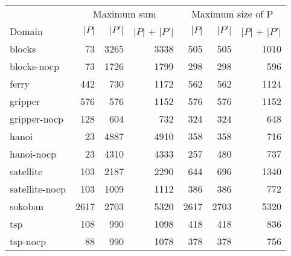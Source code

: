 \begin{tabular}{l|rrr|rrr}
	\toprule
	& \multicolumn{3}{c|}{Maximum sum} & \multicolumn{3}{c}{Maximum size of P}\\
	Domain & $\vert P \vert$ & $\vert P' \vert$ & $\vert P \vert$ + $\vert P' \vert$ & $\vert P \vert$  & $\vert P' \vert$ & $\vert P \vert$ + $\vert P' \vert$ \\
	\midrule
	blocks & 73 & 3265 & 3338 & 505 & 505 & 1010 \\
	blocks-nocp & 73 & 1726 & 1799 & 298 & 298 & 596 \\
	ferry & 442 & 730 & 1172 & 562 & 562 & 1124 \\
	gripper & 576 & 576 & 1152 & 576 & 576 & 1152 \\
	gripper-nocp & 128 & 604 & 732 & 324 & 324 & 648 \\
	hanoi & 23 & 4887 & 4910 & 358 & 358 & 716 \\
	hanoi-nocp & 23 & 4310 & 4333 & 257 & 480 & 737 \\
	satellite & 103 & 2187 & 2290 & 644 & 696 & 1340 \\
	satellite-nocp & 103 & 1009 & 1112 & 386 & 386 & 772 \\
	sokoban & 2617 & 2703 & 5320 & 2617 & 2703 & 5320 \\
	tsp & 108 & 990 & 1098 & 418 & 418 & 836 \\
	tsp-nocp & 88 & 990 & 1078 & 378 & 378 & 756 \\
	\bottomrule
\end{tabular}